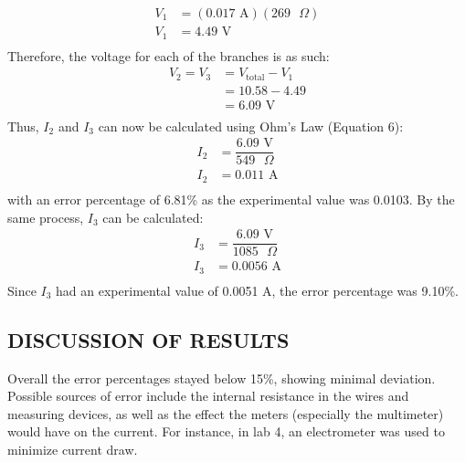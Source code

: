\documentclass [12pt, letterpaper, twoside] {article}
\begin{document}
\begin{equation*}
  \begin{split}
    V_{1} &= (0.017\text{ A})(269\text{ }\Omega) \\
    V_{1} &= 4.49\text{ V} \\ %
  \end{split}
\end{equation*}
Therefore, the voltage for each of the branches is as such:
\begin{equation*}
  \begin{split}
    V_{2} = V_{3} &= V_{\text{total}} - V_{1} \\
    &= 10.58 - 4.49 \\
    &= 6.09 \text{ V} \\ %
  \end{split}
\end{equation*} 
Thus, \(I_{2}\) and \(I_{3}\) can now be calculated using Ohm's Law (Equation 6):
\begin{equation*}
  \begin{split}
    I_{2} &= \dfrac{6.09\text{ V}}{549\text{ }\Omega} \\
    I_{2} &= 0.011 \text{ A} \\ %
  \end{split}
\end{equation*}
with an error percentage of 6.81\% as the experimental value was 0.0103. By the same process, \(I_{3}\) can be calculated: %
\begin{equation*}
  \begin{split}
    I_{3} &= \dfrac{6.09\text{ V}}{1085\text{ }\Omega} \\
    I_{3} &= 0.0056 \text{ A} \\ %
  \end{split}
\end{equation*}
Since \(I_{3}\) had an experimental value of 0.0051 A, the error percentage was 9.10\%. %

\subsection* {DISCUSSION OF RESULTS}
Overall the error percentages stayed below 15\%, showing minimal deviation. Possible sources of error include the internal resistance in the wires and measuring devices, as well as the effect the meters (especially the multimeter) would have on the current. For instance, in lab 4, an electrometer was used to minimize current draw.
\end{document}
